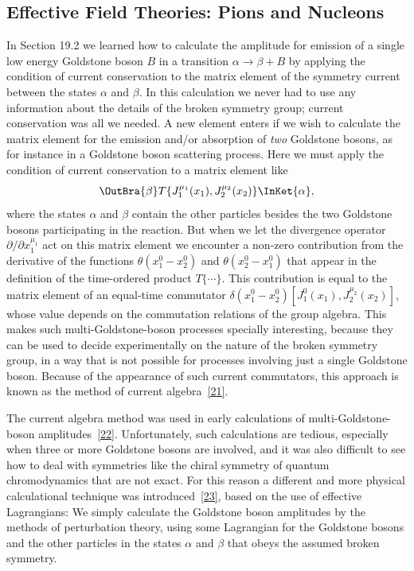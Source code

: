 
\subsection{Effective Field Theories: Pions and Nucleons}
\label{sec:19.5}

In Section 19.2 we learned how to calculate the amplitude for emission of a single low energy Goldstone boson $B$ in a transition $\alpha\to\beta+B$ by applying the condition of current conservation to the matrix element of the symmetry current between the states $\alpha$ and $\beta$. In this calculation we never had to use any information about the details of the broken symmetry group; current conservation was all we needed. A new element enters if we wish to calculate the matrix element for the emission and/or absorption of \emph{two} Goldstone bosons, as for instance in a Goldstone boson scattering process. Here we must apply the condition of current conservation to a matrix element like
\[
\OutBra{\beta}
T\{J_1^{\mu_1}(x_1),J_2^{\mu_2}(x_2)\}
\InKet{\alpha},
\]
where the states $\alpha$ and $\beta$ contain the other particles besides the two Goldstone bosons participating in the reaction. But when we let the divergence operator $\partial/\partial x_1^{\mu_1}$ act on this matrix element we encounter a non-zero contribution from the derivative of the functions $\theta(x_1^0-x_2^0)$ and $\theta(x_2^0-x_1^0)$ that appear in the definition of the time-ordered product $T\{\cdots\}$. This contribution is equal to the matrix element of an equal-time commutator $\delta(x_1^0-x_2^0)[J_1^0(x_1),J_2^{\mu_2}(x_2)]$, whose value depends on the commutation relations of the group algebra. This makes such multi-Goldstone-boson processes specially interesting, because they can be used to decide experimentally on the nature of the broken symmetry group, in a way that is not possible for processes involving just a single Goldstone boson. Because of the appearance of such current commutators, this approach is known as the method of current algebra~\hyperref[ch19-ref-21]{[21]}.

The current algebra method was used in early calculations of multi-Goldstone-boson amplitudes~\hyperref[ch19-ref-22]{[22]}. Unfortunately, such calculations are tedious, especially when three or more Goldstone bosons are involved, and it was also difficult to see how to deal with symmetries like the chiral symmetry of quantum chromodynamics that are not exact. For this reason a different and more physical calculational technique was introduced~\hyperref[ch19-ref-23]{[23]}, based on the use of effective Lagrangians: We simply calculate the Goldstone boson amplitudes by the methods of perturbation theory, using some Lagrangian for the Goldstone bosons and the other particles in the states $\alpha$ and $\beta$ that obeys the assumed broken symmetry.

